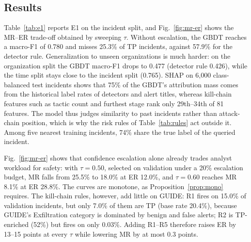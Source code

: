 \documentclass[conference]{IEEEtran}
\begin{document}
\subsection{Results}
Table~\ref{tab:e1} reports E1 on the incident split, and
Fig.~\ref{fig:mr-er} shows the MR--ER trade-off obtained by sweeping
$\tau$. Without escalation, the GBDT reaches a macro-F1 of 0.780 and
misses 25.3\% of TP incidents, against 57.9\% for the detector rule.
Generalization to unseen organizations is much harder: on the
organization split the GBDT macro-F1 drops to 0.477 (detector rule
0.426), while the time split stays close to the incident split (0.765).
SHAP on 6{,}000 class-balanced test incidents shows that 75\% of the
GBDT's attribution mass comes from the historical label rates of
detectors and alert titles, whereas kill-chain features such as tactic
count and furthest stage rank only 29th--34th of 81 features. The
model thus judges similarity to past incidents rather than attack-chain
position, which is why the risk rules of Table~\ref{tab:rules} act
outside it. Among five nearest training incidents, 74\% share the true
label of the queried incident.

Fig.~\ref{fig:mr-er} shows that confidence escalation alone already
trades analyst workload for safety: with $\tau=0.50$, selected on
validation under a 20\% escalation budget, MR falls from 25.5\% to
18.0\% at ER 12.0\%, and $\tau=0.60$ reaches MR 8.1\% at ER 28.8\%.
The curves are monotone, as Proposition~\ref{prop:mono} requires. The
kill-chain rules, however, add little on GUIDE: R1 fires on 15.0\% of
validation incidents, but only 7.0\% of them are TP (base rate
20.4\%), because GUIDE's Exfiltration category is dominated by benign
and false alerts; R2 is TP-enriched (52\%) but fires on only 0.03\%.
Adding R1--R5 therefore raises ER by 13--15 points at every $\tau$
while lowering MR by at most 0.3 points.
\end{document}
